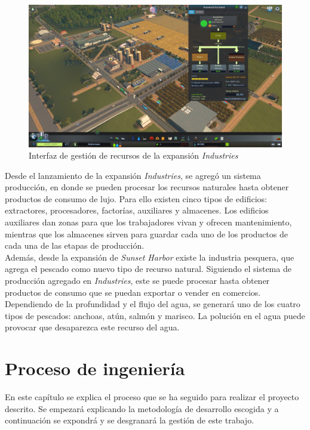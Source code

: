 \begin{figure}[h]
	\centering
	\includegraphics[width=\textwidth]{images/industries}
	\caption{Interfaz de gestión de recursos de la expansión \textit{Industries}}
	\label{fig:industry}
\end{figure}


Desde el lanzamiento de la expansión \textit{Industries}, se agregó un sistema producción, en donde se pueden procesar los recursos naturales hasta obtener productos de consumo de lujo. Para ello existen cinco tipos de edificios: extractores, procesadores, factorías, auxiliares y almacenes. Los edificios auxiliares dan zonas para que los trabajadores vivan y ofrecen mantenimiento, mientras que los almacenes sirven para guardar cada uno de los productos de cada una de las etapas de producción. \\

Además, desde la expansión de \textit{Sunset Harbor} existe la industria pesquera, que agrega el pescado como nuevo tipo de recurso natural. Siguiendo el sistema de producción agregado en \textit{Industries}, este se puede procesar hasta obtener productos de consumo que se puedan exportar o vender en comercios. Dependiendo de la profundidad y el flujo del agua, se generará uno de los cuatro tipos de pescados: anchoas, atún, salmón y marisco. La polución en el agua puede provocar que desaparezca este recurso del agua.

\section{Proceso de ingeniería}

En este capítulo se explica el proceso que se ha seguido para realizar el proyecto descrito. Se empezará explicando la metodología de desarrollo escogida y a continuación se expondrá y se desgranará la gestión de este trabajo.

